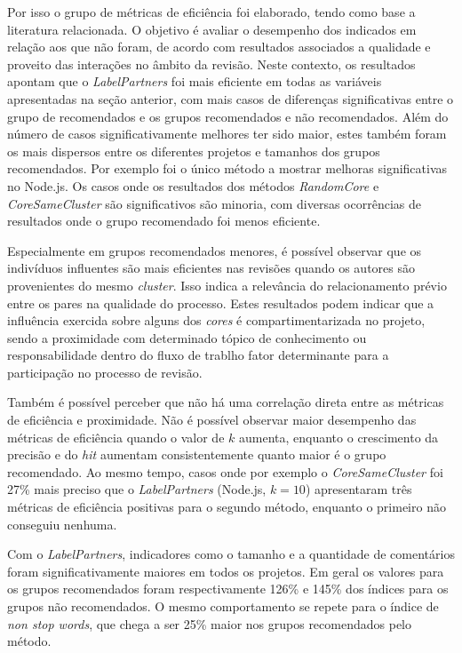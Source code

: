 \documentclass[12pt,openany,oneside,a4paper,english,brazil]{abntbibufjf}
\begin{document}
Por isso o grupo de métricas de eficiência foi elaborado, tendo como base a literatura relacionada. O objetivo é avaliar o desempenho dos indicados em relação aos que não foram, de acordo com resultados associados a qualidade e proveito das interações no âmbito da revisão. Neste contexto, os resultados apontam que o \textit{LabelPartners} foi mais eficiente em todas as variáveis apresentadas na seção anterior, com mais casos de diferenças significativas entre o grupo de recomendados e os grupos recomendados e não recomendados. Além do número de casos significativamente melhores ter sido maior, estes também foram os mais dispersos entre os diferentes projetos e tamanhos dos grupos recomendados. Por exemplo foi  o único método a mostrar melhoras significativas no Node.js. Os casos onde os resultados dos métodos \textit{RandomCore} e \textit{CoreSameCluster} são significativos são minoria, com diversas ocorrências de resultados onde o grupo recomendado foi menos eficiente.

Especialmente em grupos recomendados menores, é possível observar que os indivíduos influentes são mais eficientes nas revisões quando os autores são provenientes do mesmo \textit{cluster}. Isso indica a relevância do relacionamento prévio entre os pares na qualidade do processo. Estes resultados podem indicar que a influência exercida sobre alguns dos \textit{cores} é compartimentarizada no projeto, sendo a proximidade com determinado tópico de conhecimento ou responsabilidade dentro do fluxo de trablho fator determinante para a participação no processo de revisão.

Também é possível perceber que não há uma correlação direta entre as métricas de eficiência e proximidade. Não é possível observar maior desempenho das métricas de eficiência quando o valor de $k$ aumenta, enquanto o crescimento da precisão e do \textit{hit} aumentam consistentemente quanto maior é o grupo recomendado. Ao mesmo tempo, casos onde por exemplo o \textit{CoreSameCluster} foi 27\% mais preciso que o \textit{LabelPartners} (Node.js, $k = 10$) apresentaram três métricas de eficiência positivas para o segundo método, enquanto o primeiro não conseguiu nenhuma.

Com o \textit{LabelPartners}, indicadores como o tamanho e a quantidade de comentários foram significativamente maiores em todos os projetos. Em geral os valores para os grupos recomendados foram respectivamente 126\% e 145\% dos índices para os grupos não recomendados. O mesmo comportamento se repete para o índice de \textit{non stop words}, que chega a ser 25\% maior nos grupos recomendados pelo método.
\end{document}

